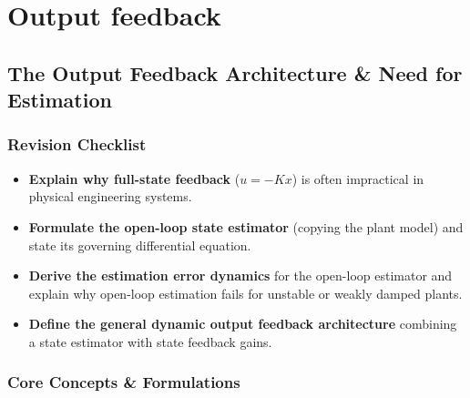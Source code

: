 \documentclass[12pt,onecolumn,twoside ]{article}
\begin{document}
	\newpage
	\section{Output feedback}

	
	\subsection{The Output Feedback Architecture \& Need for Estimation}
	\subsubsection{Revision Checklist}
	\begin{itemize}
		\item[$\square$]
		\textbf{Explain why full-state feedback} ($u = -Kx$) is often impractical in physical engineering systems.
		\item[$\square$]
		\textbf{Formulate the open-loop state estimator} (copying the plant model) and state its governing differential equation.
		\item[$\square$]
		\textbf{Derive the estimation error dynamics} for the open-loop estimator and explain why open-loop estimation fails for unstable or weakly damped plants.
		\item[$\square$]
		\textbf{Define the general dynamic output feedback architecture} combining a state estimator with state feedback gains.
	\end{itemize}
	
	\subsubsection{Core Concepts \& Formulations}
\end{document}
